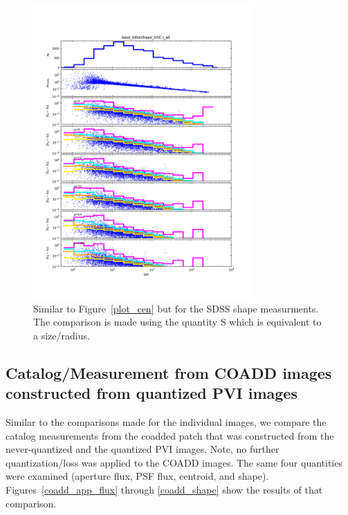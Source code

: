 \begin{figure}
\centering
\includegraphics[width=0.75\textwidth]{figure/rplot_all_base_SdssShape_HSC-I.png}
\caption{Similar to Figure~\ref{plot_cen} but for the SDSS shape measurments.  The comparison is made using the quantity S which is equivalent to
a size/radius.}
\label{plot_shape}
\end{figure}




\subsection{Catalog/Measurement from COADD images constructed from quantized PVI images}

Similar to the comparisons made for the individual images, we compare the catalog measurements from the coadded patch
that was constructed from the never-quantized and the quantized PVI images.  Note, no further quantization/loss was applied
to the COADD images.  The same four quantities were examined (aperture flux, PSF flux, centroid, and shape).  
Figures~\ref{coadd_app_flux} through \ref{coadd_shape} show the results of that comparison.

